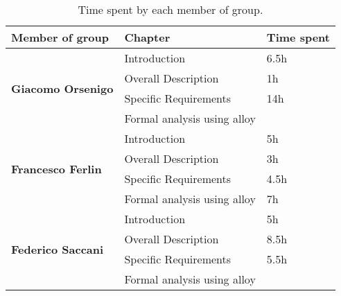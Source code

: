 \begin{table}[H]
      \centering
      \begin{tabular}{|l|l|l|}
            \hline
            \textbf{Member of group }                  & \textbf{Chapter}            & \textbf{Time spent} \\\hline
            \multirow{4}{*}{\textbf{Giacomo Orsenigo}} & Introduction                & 6.5h                \\
                                                       & Overall Description         & 1h                  \\
                                                       & Specific Requirements       & 14h                 \\
                                                       & Formal analysis using alloy &                     \\\hline
            \multirow{4}{*}{\textbf{Francesco Ferlin}} & Introduction                & 5h                  \\
                                                       & Overall Description         & 3h                  \\
                                                       & Specific Requirements       & 4.5h                \\
                                                       & Formal analysis using alloy & 7h                  \\\hline
            \multirow{4}{*}{\textbf{Federico Saccani}} & Introduction                & 5h                  \\
                                                       & Overall Description         & 8.5h                \\
                                                       & Specific Requirements       & 5.5h                \\
                                                       & Formal analysis using alloy &                     \\\hline
      \end{tabular}
      \caption{Time spent by each member of group.}
      \label{table:Time spent}
\end{table}

